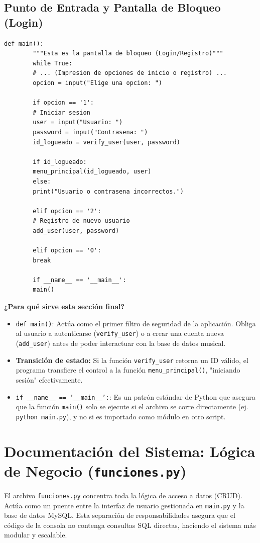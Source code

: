 \documentclass[11pt]{article}
\begin{document}
	\subsection{Punto de Entrada y Pantalla de Bloqueo (Login)}
	\begin{lstlisting}[style=pythonstyle]
		def main():
		"""Esta es la pantalla de bloqueo (Login/Registro)"""
		while True:
		# ... (Impresion de opciones de inicio o registro) ...
		opcion = input("Elige una opcion: ")
		
		if opcion == '1':
		# Iniciar sesion
		user = input("Usuario: ")
		password = input("Contrasena: ")
		id_logueado = verify_user(user, password)
		
		if id_logueado:
		menu_principal(id_logueado, user)
		else:
		print("Usuario o contrasena incorrectos.")
		
		elif opcion == '2':
		# Registro de nuevo usuario
		add_user(user, password)
		
		elif opcion == '0':
		break
		
		if __name__ == '__main__':
		main()
	\end{lstlisting}
	
	\noindent\textbf{¿Para qué sirve esta sección final?}
	\begin{itemize}[noitemsep,topsep=2pt]
		\item \texttt{def main()}: Actúa como el primer filtro de seguridad de la aplicación. Obliga al usuario a autenticarse (\texttt{verify\_user}) o a crear una cuenta nueva (\texttt{add\_user}) antes de poder interactuar con la base de datos musical.
		\item \textbf{Transición de estado:} Si la función \texttt{verify\_user} retorna un ID válido, el programa transfiere el control a la función \texttt{menu\_principal()}, "iniciando sesión" efectivamente.
		\item \texttt{if \_\_name\_\_ == '\_\_main\_\_':}: Es un patrón estándar de Python que asegura que la función \texttt{main()} solo se ejecute si el archivo se corre directamente (ej. \texttt{python main.py}), y no si es importado como módulo en otro script.
	\end{itemize}
	\newpage
	\section{Documentación del Sistema: Lógica de Negocio (\texttt{funciones.py})}
	
	El archivo \texttt{funciones.py} concentra toda la lógica de acceso a datos (CRUD). Actúa como un puente entre la interfaz de usuario gestionada en \texttt{main.py} y la base de datos MySQL. Esta separación de responsabilidades asegura que el código de la consola no contenga consultas SQL directas, haciendo el sistema más modular y escalable.
	
\end{document}
